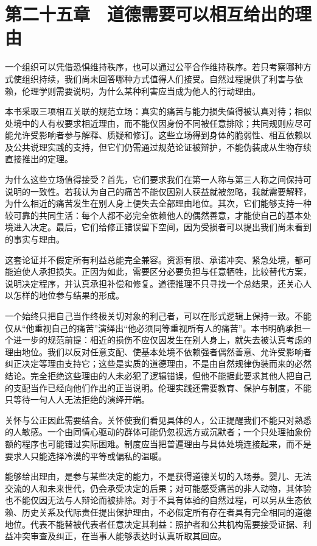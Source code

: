 \documentclass[
  11pt,
  oneside]{book}
\begin{document}
\par\endgroup

\chapter{第二十五章　道德需要可以相互给出的理由}\label{ph-ch-25}

一个组织可以凭借恐惧维持秩序，也可以通过公平合作维持秩序。若只考察哪种方式使组织持续，我们尚未回答哪种方式值得人们接受。自然过程提供了利害与依赖，伦理学则需要说明，为什么某种利害应当成为他人的行动理由。

本书采取三项相互关联的规范立场：真实的痛苦与能力损失值得被认真对待；相似处境中的人有权要求相近理由，而不能仅因身份不同被任意排除；共同规则应尽可能允许受影响者参与解释、质疑和修订。这些立场得到身体的脆弱性、相互依赖以及公共说理实践的支持，但它们仍需通过规范论证被辩护，不能伪装成从生物存续直接推出的定理。

为什么这些立场值得接受？首先，它们要求我们在第一人称与第三人称之间保持可说明的一致性。若我认为自己的痛苦不能仅因别人获益就被忽略，我就需要解释，为什么相近的痛苦发生在别人身上便失去全部理由地位。其次，它们能够支持一种较可靠的共同生活：每个人都不必完全依赖他人的偶然善意，才能使自己的基本处境进入决定。最后，它们给修正错误留下空间，因为受损者可以提出我们尚未看到的事实与理由。

这套论证并不假定所有利益总能完全兼容。资源有限、承诺冲突、紧急处境，都可能迫使人承担损失。正因为如此，需要区分必要负担与任意牺牲，比较替代方案，说明决定程序，并认真承担补偿和修复。道德推理不只寻找一个总结果，还关心人以怎样的地位参与结果的形成。

一个始终只把自己当作终极关切对象的利己者，可以在形式逻辑上保持一致。不能仅从``他重视自己的痛苦''演绎出``他必须同等重视所有人的痛苦''。本书明确承担一个进一步的规范前提：相近的损伤不应仅因发生在别人身上，就失去被认真考虑的理由地位。我们以反对任意支配、使基本处境不依赖强者偶然善意、允许受影响者纠正决定等理由支持它；这些是实质的道德理由，不是由自然规律伪装而来的必然结论。完全拒绝这些理由的人未必犯了逻辑错误，但他不能据此要求其他人把自己的支配当作已经向他们作出的正当说明。伦理实践还需要教育、保护与制度，不能只等待一句人人无法拒绝的演绎开端。

关怀与公正因此需要结合。关怀使我们看见具体的人，公正提醒我们不能只对熟悉的人敏感。一个由同情心驱动的群体可能仍忽视远方或沉默者；一个只处理抽象份额的程序也可能错过实际困难。制度应当把普遍理由与具体处境连接起来，而不是要求人只能选择冷漠的平等或偏私的温暖。

能够给出理由，是参与某些决定的能力，不是获得道德关切的入场券。婴儿、无法交流的人和未来世代，仍会承受决定的后果；对可能感受痛苦的非人动物，其体验也不能仅因无法与人辩论而被排除。对于不具有体验的自然过程，可以另从生态依赖、历史关系及代际责任提出保护理由，不必假定所有存在者具有完全相同的道德地位。代表不能替被代表者任意决定其利益：照护者和公共机构需要接受证据、利益冲突审查及纠正，在当事人能够表达时认真听取其回应。
\end{document}
